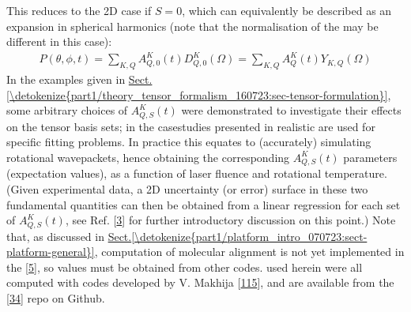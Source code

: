 \documentclass[letterpaper,table,10pt,english]{jupyterBook}
\begin{document}
\sphinxAtStartPar
This reduces to the 2D case if \(S=0\), which can equivalently be described as an expansion in spherical harmonics (note that the normalisation of the {\hyperref[\detokenize{backmatter/glossary:term-ADMs}]{}} may be different in this case):
\begin{equation}\label{equation:part1/theory_molecular_alignment_170723:eqn:P-omega-t-2D}
\begin{split} 
P(\theta,\phi,t) = \sum_{K,Q} A^K_{Q,0}(t)D^K_{Q,0}(\Omega) = \sum_{K,Q} A^K_{Q}(t)Y_{K,Q}(\Omega)
\end{split}
\end{equation}
\sphinxAtStartPar
In the examples given in \hyperref[\detokenize{part1/theory_tensor_formalism_160723:sec-tensor-formulation}]{Sect.\@ \ref{\detokenize{part1/theory_tensor_formalism_160723:sec-tensor-formulation}}}, some arbitrary choices of \(A^K_{Q,S}(t)\) were demonstrated to investigate their effects on the tensor basis sets; in the case\sphinxhyphen{}studies presented in {\hyperref[\detokenize{part2/extracting_matrix_elements_overview_270423:chpt-extracting-matrix-elements-overview}]{}} realistic {\hyperref[\detokenize{backmatter/glossary:term-ADMs}]{}} are used for specific fitting problems. In practice this equates to (accurately) simulating rotational wavepackets, hence obtaining the corresponding \(A_{Q,S}^{K}(t)\) parameters (expectation values), as a function of laser fluence and rotational temperature. (Given experimental data, a 2D uncertainty (or error) surface in these two fundamental quantities can then be obtained from a linear regression for each set of \(A_{Q,S}^{K}(t)\), see Ref. {[}\hyperlink{cite.backmatter/bibliography:id685}{3}{]} for further introductory discussion on this point.) Note that, as discussed in \hyperref[\detokenize{part1/platform_intro_070723:sect-platform-general}]{Sect.\@ \ref{\detokenize{part1/platform_intro_070723:sect-platform-general}}}, computation of molecular alignment is not yet implemented in the  {[}\hyperlink{cite.backmatter/bibliography:id681}{5}{]}, so values must be obtained from other codes. {\hyperref[\detokenize{backmatter/glossary:term-ADMs}]{}} used herein were all computed with codes developed by V. Makhija {[}\hyperlink{cite.backmatter/bibliography:id771}{115}{]}, and are available from the  {[}\hyperlink{cite.backmatter/bibliography:id607}{34}{]} repo on Github.
\end{document}
